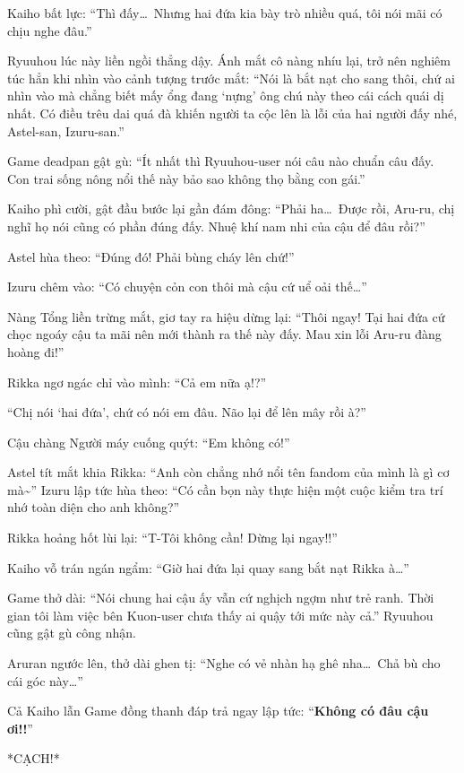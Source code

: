 \documentclass[../main.tex]{subfiles}
\begin{document}
Kaiho bất lực: ``Thì đấy\dots\ Nhưng hai đứa kia bày trò nhiều quá, tôi nói mãi có chịu nghe đâu.''

Ryuuhou lúc này liền ngồi thẳng dậy. Ánh mắt cô nàng nhíu lại, trở nên nghiêm túc hẳn khi nhìn vào cảnh tượng trước mắt: ``Nói là bắt nạt cho sang thôi, chứ ai nhìn vào mà chẳng biết mấy ổng đang `nựng' ông chú này theo cái cách quái dị nhất. Có điều trêu dai quá đà khiến người ta cộc lên là lỗi của hai người đấy nhé, Astel-san, Izuru-san.''

Game deadpan gật gù: ``Ít nhất thì Ryuuhou-user nói câu nào chuẩn câu đấy. Con trai sống nông nổi thế này bảo sao không thọ bằng con gái.''

Kaiho phì cười, gật đầu bước lại gần đám đông: ``Phải ha\dots\ Được rồi, Aru-ru, chị nghĩ họ nói cũng có phần đúng đấy. Nhuệ khí nam nhi của cậu để đâu rồi?''

Astel hùa theo: ``Đúng đó! Phải bùng cháy lên chứ!''

Izuru chêm vào: ``Có chuyện cỏn con thôi mà cậu cứ uể oải thế\dots''

Nàng Tổng liền trừng mắt, giơ tay ra hiệu dừng lại: ``Thôi ngay! Tại hai đứa cứ chọc ngoáy cậu ta mãi nên mới thành ra thế này đấy. Mau xin lỗi Aru-ru đàng hoàng đi!''

Rikka ngơ ngác chỉ vào mình: ``Cả em nữa ạ!?''

``Chị nói `hai đứa', chứ có nói em đâu. Não lại để lên mây rồi à?''

Cậu chàng Người máy cuống quýt: ``Em không có!''

Astel tít mắt khia Rikka: ``Anh còn chẳng nhớ nổi tên fandom của mình là gì cơ mà\~{}'' Izuru lập tức hùa theo: ``Có cần bọn này thực hiện một cuộc kiểm tra trí nhớ toàn diện cho anh không?''

Rikka hoảng hốt lùi lại: ``T-Tôi không cần! Dừng lại ngay!!''

Kaiho vỗ trán ngán ngẩm: ``Giờ hai đứa lại quay sang bắt nạt Rikka à\dots''

Game thở dài: ``Nói chung hai cậu ấy vẫn cứ nghịch ngợm như trẻ ranh. Thời gian tôi làm việc bên Kuon-user chưa thấy ai quậy tới mức này cả.'' Ryuuhou cũng gật gù công nhận.

Aruran ngước lên, thở dài ghen tị: ``Nghe có vẻ nhàn hạ ghê nha\dots\ Chả bù cho cái góc này\dots''

Cả Kaiho lẫn Game đồng thanh đáp trả ngay lập tức: ``\textbf{Không có đâu cậu ơi!!}''

\ct

*CẠCH!*
\end{document}
